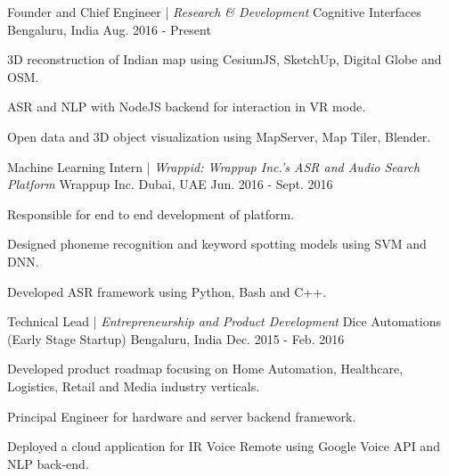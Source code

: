 \vspace{-1em}
\begin{cventries}
\cventry
	{Founder and Chief Engineer | \textit{Research \& Development}}
	{Cognitive Interfaces}
	{Bengaluru, India}
	{Aug. 2016 - Present}
	{ \begin{cvitems}
		\item {3D reconstruction of Indian map using CesiumJS, SketchUp, Digital Globe and OSM. \href{https://prakshep.com}{}}
		\item {ASR and NLP with NodeJS backend for interaction in VR mode.}
		\item {Open data and 3D object visualization using MapServer, Map Tiler, Blender. \href{https://maps.prakshep.com}{}}
	  \end{cvitems}	
	}

	\cventry
	{Machine Learning Intern | \textit{Wrappid: Wrappup Inc.'s ASR and Audio Search Platform}}
	{Wrappup Inc.}
	{Dubai, UAE}
	{Jun. 2016 - Sept. 2016}
	{ \begin{cvitems}
		\item {Responsible for end to end development of platform.}
		\item {Designed phoneme recognition and keyword spotting models using SVM and DNN.}
		\item {Developed ASR framework using Python, Bash and C++.}		
	  \end{cvitems}
	}

\cventry
  	{Technical Lead | \textit{Entrepreneurship and Product Development}}
  	{Dice Automations (Early Stage Startup)}
  	{Bengaluru, India}
  	{Dec. 2015 - Feb. 2016}
  	{ \begin{cvitems}
  		\item {Developed product roadmap focusing on Home Automation, Healthcare, Logistics, Retail and Media industry verticals.}
		\item {Principal Engineer for hardware and server backend framework.}
		\item {Deployed a cloud application for IR Voice Remote using Google Voice API and NLP back-end.}
		\end{cvitems}  	
  	}
  	  

\end{cventries}
